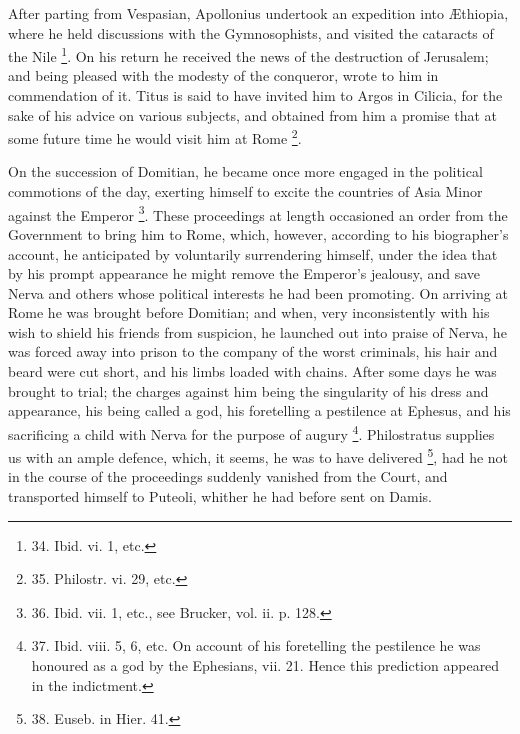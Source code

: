 After parting from Vespasian,
Apollonius undertook an expedition into Æthiopia, where he held
discussions with the Gymnosophists, and visited the cataracts of the
Nile \footnote{34.
Ibid. vi. 1, etc.}. On his return he
received the news of the destruction of Jerusalem; and being
pleased with the modesty of the conqueror, wrote to him in
commendation of it. Titus is said to have invited him to Argos in
Cilicia, for the sake of his advice on various subjects, and obtained
from him a promise that at some future time he would visit him at Rome
\footnote{35.
Philostr. vi. 29, etc.}.

On the succession of Domitian,
he became once more engaged in the political commotions of the day,
exerting himself to excite the countries of Asia Minor against the
Emperor \footnote{36.
Ibid. vii. 1, etc., see Brucker, vol. ii. p. 128.}. These
proceedings at length occasioned an order from the Government to bring
him to Rome, which, however, according to his biographer's account, he
anticipated by voluntarily surrendering himself, under the idea that
by his prompt appearance he might remove the Emperor's jealousy, and
save Nerva and others whose political interests he had been promoting.
On arriving at Rome he was brought before Domitian; and when, very
inconsistently with his wish to shield his friends from suspicion, he
launched out into praise of Nerva, he was forced away into prison to
the company of the worst criminals, his hair and beard were cut short,
and his limbs loaded with chains. After some days he was brought to
trial; the charges against him being the singularity of his dress and
appearance, his being called a god, his foretelling a pestilence at
Ephesus, and his sacrificing a child with Nerva for the purpose of
augury \footnote{37.
Ibid. viii. 5, 6, etc. On account of his foretelling the pestilence he
was honoured as a god by the Ephesians, vii. 21. Hence this prediction
appeared in the indictment.}. Philostratus
supplies us with an ample defence, which, it seems, he was to have
delivered \footnote{38.
Euseb. in Hier. 41.}, had he not
in the course of the proceedings suddenly vanished from the Court, and
transported himself to Puteoli, whither he had before sent on
Damis.

